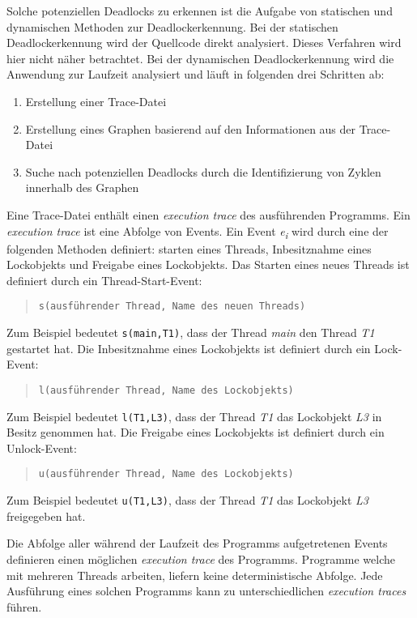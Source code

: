 Solche potenziellen Deadlocks zu erkennen ist die Aufgabe von statischen und
dynamischen Methoden zur Deadlockerkennung. Bei der statischen Deadlockerkennung
wird der Quellcode direkt analysiert. Dieses Verfahren wird hier nicht näher
betrachtet. Bei der dynamischen Deadlockerkennung wird die Anwendung zur
Laufzeit analysiert und läuft in folgenden drei Schritten ab:
\begin{enumerate}
  \item Erstellung einer Trace-Datei
  \item Erstellung eines Graphen basierend auf den Informationen aus der
  Trace-Datei
  \item Suche nach potenziellen Deadlocks durch die Identifizierung von Zyklen
  innerhalb des Graphen
\end{enumerate}
Eine Trace-Datei enthält einen \emph{execution trace}\label{text:ExecutionTrace}
des ausführenden Programms. Ein \emph{execution trace} ist eine Abfolge von
Events. Ein Event \emph{e\textsubscript{i}} wird durch eine der folgenden
Methoden definiert: starten eines Threads, Inbesitznahme eines Lockobjekts und
Freigabe eines Lockobjekts. Das Starten eines neues Threads ist definiert durch
ein Thread-Start-Event:
\begin{quote}
\texttt{s(ausführender Thread, Name des neuen Threads)}
\end{quote}
Zum Beispiel bedeutet \texttt{s(main,T1)}, dass der Thread \emph{main} den
Thread \emph{T1} gestartet hat. Die Inbesitznahme eines Lockobjekts ist
definiert durch ein Lock-Event:
\begin{quote}
\texttt{l(ausführender Thread, Name des Lockobjekts)}
\end{quote}
Zum Beispiel bedeutet \texttt{l(T1,L3)}, dass der Thread \emph{T1} das
Lockobjekt \emph{L3} in Besitz genommen hat. Die Freigabe eines Lockobjekts ist
definiert durch ein Unlock-Event:
\begin{quote}
\texttt{u(ausführender Thread, Name des Lockobjekts)}
\end{quote}
Zum Beispiel bedeutet \texttt{u(T1,L3)}, dass der Thread \emph{T1} das
Lockobjekt \emph{L3} freigegeben hat.

Die Abfolge aller während der Laufzeit des Programms aufgetretenen Events
definieren einen möglichen \emph{execution trace} des Programms. Programme
welche mit mehreren Threads arbeiten, liefern keine deterministische Abfolge.
Jede Ausführung eines solchen Programms kann zu unterschiedlichen
\emph{execution traces} führen. 

